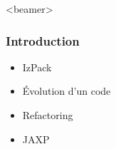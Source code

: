 \begin{frame}<beamer>
\frametitle{Introduction}
\begin{itemize}
	\item IzPack
	\item Évolution d'un code
	\item Refactoring
	\item JAXP
\end{itemize}
\end{frame}



